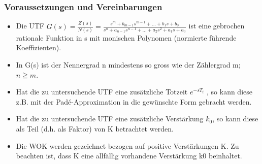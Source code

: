 \subsubsection{Voraussetzungen und Vereinbarungen }
\begin{itemize}
\item  Die UTF $G(s)=\frac{Z(s)}{N(s)}=\frac{s^m + b_{m-1}s^{m-1}+ ... + b_{1}s+b_{0}}{s^{n}+a_{n-1}s^{n-1} + ... + a_{2}s^{2}+a_{1}s + a_{0}}$
ist eine gebrochen rationale
Funktion in s mit monischen Polynomen (normierte führende Koeffizienten).
\item  In G(s) ist der Nennergrad n mindestens so gross wie der Zählergrad m; $n \geqq m$.
\item  Hat die zu untersuchende UTF eine zusätzliche Totzeit $e^{-sT_t}$ , so kann diese
z.B. mit der Padé-Approximation in die gewünschte Form gebracht werden.
\item  Hat die zu untersuchende UTF eine zusätzliche Verstärkung $k_0$, so kann diese
als Teil (d.h. als Faktor) von K betrachtet werden.
\item  Die WOK werden gezeichnet bezogen auf positive Verstärkungen K. Zu beachten
ist, dass K eine allfällig vorhandene Verstärkung k0 beinhaltet.
\end{itemize}

